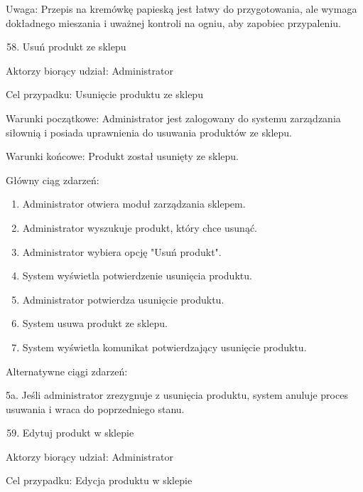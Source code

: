 \documentclass[
]{article}
\providecommand{\tightlist}{%
  \setlength{\itemsep}{0pt}\setlength{\parskip}{0pt}}
\begin{document}
{Uwaga: Przepis na kremówkę papieską jest łatwy do przygotowania, ale
wymaga dokładnego mieszania i uważnej kontroli na ogniu, aby zapobiec
przypaleniu.}

{}

\begin{enumerate}
\setcounter{enumi}{57}
\tightlist
\item
  {Usuń produkt ze sklepu}
\end{enumerate}

{Aktorzy biorący udział: Administrator}

{Cel przypadku: Usunięcie produktu ze sklepu}

{Warunki początkowe: Administrator jest zalogowany do systemu
zarządzania siłownią i posiada uprawnienia do usuwania produktów ze
sklepu.}

{Warunki końcowe: Produkt został usunięty ze sklepu.}

{Główny ciąg zdarzeń:}

\begin{enumerate}
\tightlist
\item
  {Administrator otwiera moduł zarządzania sklepem.}
\item
  {Administrator wyszukuje produkt, który chce usunąć.}
\item
  {Administrator wybiera opcję "Usuń produkt".}
\item
  {System wyświetla potwierdzenie usunięcia produktu.}
\item
  {Administrator potwierdza usunięcie produktu.}
\item
  {System usuwa produkt ze sklepu.}
\item
  {System wyświetla komunikat potwierdzający usunięcie produktu.}
\end{enumerate}

{Alternatywne ciągi zdarzeń:}

{5a. Jeśli administrator zrezygnuje z usunięcia produktu, system anuluje
proces usuwania i wraca do poprzedniego stanu.}

{}

{}

\begin{enumerate}
\setcounter{enumi}{58}
\tightlist
\item
  {Edytuj produkt w sklepie}
\end{enumerate}

{Aktorzy biorący udział: Administrator}

{Cel przypadku: Edycja produktu w sklepie}
\end{document}
